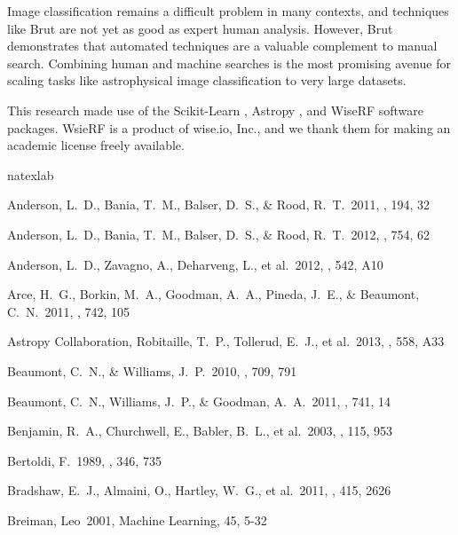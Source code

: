 \documentclass[preprint]{aastex}
\begin{document}
Image classification remains a difficult problem in many contexts, and techniques like Brut are not yet as good as expert human analysis. However, Brut demonstrates that automated techniques are a valuable complement to manual search.  Combining human and machine searches is the most promising avenue for scaling tasks like astrophysical image classification to very large datasets.

This research made use of the Scikit-Learn \citep{Pedregosa11}, Astropy \citep{Astropy}, and WiseRF software packages. WsieRF is a product of wise.io, Inc., and we thank them for making an academic license freely available.

\begin{thebibliography}{16}
\expandafter\ifx\csname natexlab\endcsname\relax\def\natexlab#1{#1}\fi

 Anderson, L.~D., 
Bania, T.~M., Balser, D.~S., \& Rood, R.~T.\ 2011, \apjs, 194, 32 

 Anderson, L.~D., 
Bania, T.~M., Balser, D.~S., \& Rood, R.~T.\ 2012, \apj, 754, 62 

 Anderson, L.~D., Zavagno, A., Deharveng, L., et al.\ 2012, \aap, 542, A10 

 Arce, H.~G., Borkin, 
M.~A., Goodman, A.~A., Pineda, J.~E., 
\& Beaumont, C.~N.\ 2011, \apj, 742, 105

 Astropy Collaboration, Robitaille, T.~P., Tollerud, E.~J., et al.\ 2013, \aap, 558, A33 

 Beaumont, C.~N., \& Williams, J.~P.\ 2010, \apj, 709, 791 

 Beaumont, C.~N., 
Williams, J.~P., \& Goodman, A.~A.\ 2011, \apj, 741, 14 

 Benjamin, R.~A., 
Churchwell, E., Babler, B.~L., et al.\ 2003, \pasp, 115, 953 

 Bertoldi, F.\ 1989, \apj, 
346, 735 

 Bradshaw, E.~J., 
Almaini, O., Hartley, W.~G., et al.\ 2011, \mnras, 415, 2626 

 Breiman, Leo\ 2001, Machine Learning, 45, 5-32


\end{thebibliography}
\end{document}
